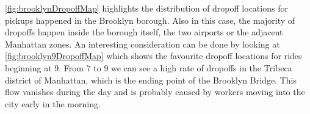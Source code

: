 \documentclass{acm_proc_article-sp-sigmod09}
\begin{document}
\cref{fig:brooklynDropoffMap} highlights the distribution of dropoff locations for pickups happened in the Brooklyn borough. Also in this case, the majority of dropoffs happen inside the borough itself, the two airports or the adjacent Manhattan zones. An interesting consideration can be done by looking at \cref{fig:brooklyn9DropoffMap} which shows the favourite dropoff locations for rides beginning at 9. From 7 to 9 we can see a high rate of dropoffs in the Tribeca district of Manhattan, which is the ending point of the Brooklyn Bridge. This flow vanishes during the day and is probably caused by workers moving into the city early in the morning. 

\begin{figure}
	\centering
	\\
	\\

\end{figure}
\end{document}
